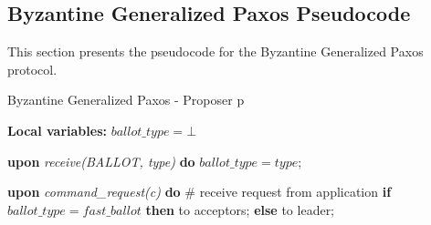\subsection{Byzantine Generalized Paxos Pseudocode} \label{bft_code}
This section presents the pseudocode for the Byzantine Generalized Paxos protocol. \par


\begin{algorithm}[h] 
	\caption{Byzantine Generalized Paxos - Proposer p}
	\label{BFT-Prop}
	\textbf{Local variables:} $ballot\_type = \bot$
	\begin{algorithmic}[1]
			
		\State \textbf{upon} \textit{receive(BALLOT, type)} \textbf{do} 
		\State \hspace{\algorithmicindent} $ballot\_type = type$;
		\State
		
		\State \textbf{upon} \textit{command\_request(c)} \textbf{do}   \hspace{\algorithmicindent}\hspace{\algorithmicindent}\hspace{\algorithmicindent}\hspace{\algorithmicindent}\# receive request from application
		\State \hspace{\algorithmicindent} \textbf{if} $ballot\_type = fast\_ballot$ \textbf{then}
		\State \hspace{\algorithmicindent}\hspace{\algorithmicindent}  to acceptors;
		\State \hspace{\algorithmicindent} \textbf{else} 
		\State \hspace{\algorithmicindent}\hspace{\algorithmicindent}  to leader;		
	\end{algorithmic}
\end{algorithm}
